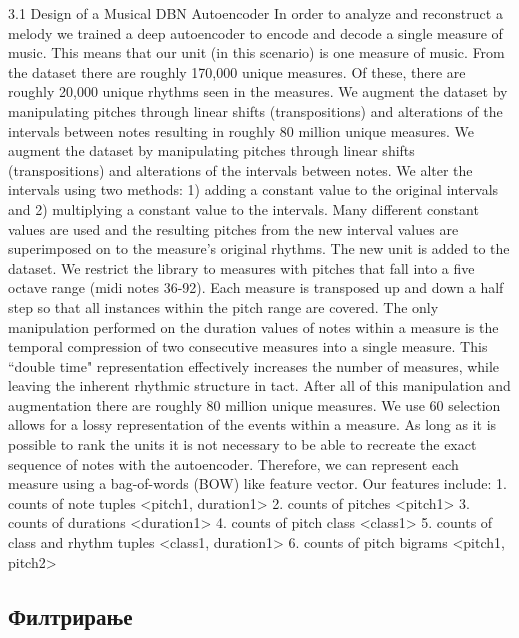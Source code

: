 \cite{Bretan2016} 3.1 Design of a Musical DBN Autoencoder
In order to analyze and reconstruct a melody we trained a deep autoencoder to encode and decode a single measure of music. This means that our unit (in this scenario) is one measure of music. From the dataset there are roughly 170,000 unique measures. Of these, there are roughly 20,000 unique rhythms seen in the measures. We augment the dataset by manipulating pitches through linear shifts (transpositions) and alterations of the intervals between notes resulting in roughly 80 million unique measures. We augment the dataset by manipulating pitches through linear shifts (transpositions) and alterations
of the intervals between notes. We alter the intervals using two methods: 1) adding a constant value to the original intervals and 2) multiplying a constant value to the intervals. Many different constant values are used and the resulting pitches from the new interval values are superimposed on to the measure’s original rhythms. The new unit is added to the dataset. We restrict the library to measures with pitches that fall into a five octave range (midi notes 36-92). Each measure is transposed up and down a half step so that all instances within the pitch range are covered. The only manipulation performed on the duration values of notes within a measure is the temporal compression of two consecutive measures into a single measure. This “double time" representation effectively increases the number of measures, while leaving the inherent rhythmic structure in tact. After all of this manipulation and augmentation there are roughly 80 million unique measures. We use 60%
selection allows for a lossy representation of the events within a measure. As long as it is possible to rank the units it is not necessary to be able to recreate the exact sequence of notes with the autoencoder. Therefore, we can represent each measure using a bag-of-words (BOW) like feature vector. Our features include:
1. counts of note tuples <pitch1, duration1> 2. counts of pitches <pitch1> 3. counts of durations <duration1> 4. counts of pitch class <class1> 5. counts of class and rhythm tuples <class1, duration1> 6. counts of pitch bigrams <pitch1, pitch2>

\subsection{Филтрирање}


